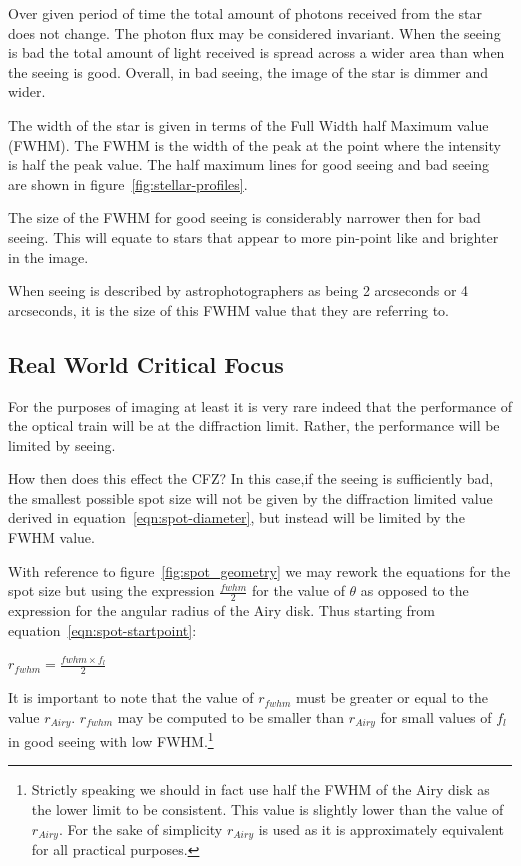 \documentclass[11pt]{article}
\begin{document}
Over given period of time the total amount of photons received from the star does not change. The photon flux may be considered invariant. When the seeing is bad the total amount of light received is spread across a wider area than when the seeing is good. Overall, in bad seeing, the image of the star is dimmer and wider.

The width of the star is given in terms of the Full Width half Maximum value (FWHM).  The FWHM is the width of the peak at the point where the intensity is half the peak value.  The half maximum lines for good seeing and bad seeing are shown in figure~\ref{fig:stellar-profiles}.

The size of the FWHM for good seeing is considerably narrower then for bad seeing.  This will equate to stars that appear to more pin-point like and brighter in the image.

When seeing is described by astrophotographers as being 2 arcseconds or 4 arcseconds, it is the size of this FWHM value that they are referring to.
 
\subsection{Real World Critical Focus}

For the purposes of imaging at least it is very rare indeed that the performance of the optical train will be at the diffraction limit.  Rather, the performance will be limited by seeing.

How then does this effect the CFZ?  In this case,if the seeing is sufficiently bad, the smallest possible spot size will not be given by the diffraction limited value derived in equation~\ref{eqn:spot-diameter}, but instead will be limited by the FWHM value.

With reference to figure~\ref{fig:spot_geometry} we may rework the equations for the spot size but using the expression $\frac{fwhm}{2}$ for the value of $\theta$ as opposed to the expression for the angular radius of the Airy disk. Thus starting from equation~\ref{eqn:spot-startpoint}:

\Large
$r_{fwhm}=\frac{fwhm \times f_{l}}{2} $
\large

It is important to note that the value of $r_{fwhm}$ must be greater or equal to the value $r_{Airy}$.  $r_{fwhm}$ may be computed to be smaller than  $r_{Airy}$ for small values of $f_{l}$ in good seeing with low FWHM.\footnote{Strictly speaking we should in fact use half the FWHM of the Airy disk as the lower limit to be consistent. This value is slightly lower than the value of  $r_{Airy}$. For the sake of simplicity  $r_{Airy}$ is used as it is approximately equivalent for all practical purposes. }
\end{document}
